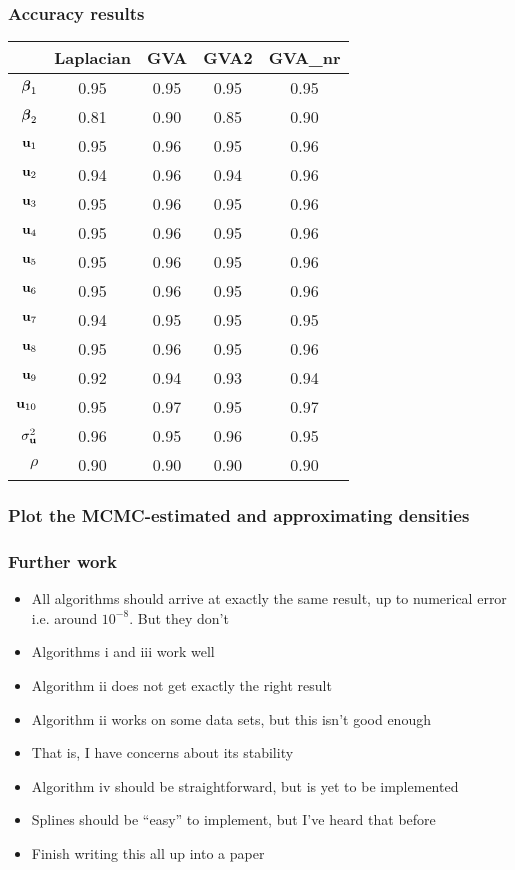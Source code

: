 \documentclass{beamer}
\begin{document}
\begin{frame}
\frametitle{Accuracy results}
\begin{tabular}{rcccc}
\hline
	& Laplacian & GVA & GVA2 & GVA\_nr \\
\hline
${\boldsymbol \beta}_1$&0.95&0.95&0.95&0.95 \\
${\boldsymbol \beta}_2$&0.81&0.90&0.85&0.90 \\
${\bf u}_1$&0.95&0.96&0.95&0.96 \\
${\bf u}_2$&0.94&0.96&0.94&0.96 \\
${\bf u}_3$&0.95&0.96&0.95&0.96 \\
${\bf u}_4$&0.95&0.96&0.95&0.96 \\
${\bf u}_5$&0.95&0.96&0.95&0.96 \\
${\bf u}_6$&0.95&0.96&0.95&0.96 \\
${\bf u}_7$&0.94&0.95&0.95&0.95 \\
${\bf u}_8$&0.95&0.96&0.95&0.96 \\
${\bf u}_9$&0.92&0.94&0.93&0.94 \\
${\bf u}_{10}$&0.95&0.97&0.95&0.97 \\
$\sigma_{\bf u}^2$&0.96&0.95&0.96&0.95 \\
$\rho$&0.90&0.90&0.90&0.90 \\
\hline
\end{tabular}
\end{frame}

\begin{frame}
\frametitle{Plot the MCMC-estimated and approximating densities}
\end{frame}

\begin{frame}
\frametitle{Further work}
\begin{itemize}
\item All algorithms should arrive at exactly the same result, up to numerical error i.e. around $10^{-8}$. But they don't
\item Algorithms i and iii work well
\item Algorithm ii does not get exactly the right result
\item Algorithm ii works on some data sets, but this isn't good enough
\item That is, I have concerns about its stability
\item Algorithm iv should be straightforward, but is yet to be implemented
\item Splines should be ``easy'' to implement, but I've heard that before
\item Finish writing this all up into a paper
\end{itemize}
\end{frame}
\end{document}
